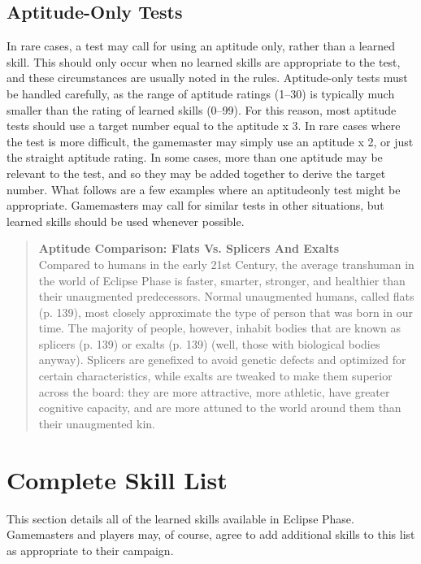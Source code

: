 \subsection{Aptitude-Only Tests}
In rare cases, a test may call for using an aptitude
only, rather than a learned skill. This should only
occur when no learned skills are appropriate to the
test, and these circumstances are usually noted in
the rules.
Aptitude-only tests must be handled carefully, as
the range of aptitude ratings (1–30) is typically much
smaller than the rating of learned skills (0–99). For
this reason, most aptitude tests should use a target
number equal to the aptitude x 3. In rare cases where
the test is more difficult, the gamemaster may simply
use an aptitude x 2, or just the straight aptitude rating.
In some cases, more than one aptitude may be relevant
to the test, and so they may be added together
to derive the target number.
What follows are a few examples where an aptitudeonly
test might be appropriate. Gamemasters may call
for similar tests in other situations, but learned skills
should be used whenever possible.



\begin{quotation}
\textbf{Aptitude Comparison: Flats Vs. Splicers And Exalts}
\\
Compared to humans in the early 21st Century, the average transhuman in the world of Eclipse Phase is faster,
smarter, stronger, and healthier than their unaugmented predecessors. Normal unaugmented humans, called
flats (p. 139), most closely approximate the type of person that was born in our time. The majority of people,
however, inhabit bodies that are known as splicers (p. 139) or exalts (p. 139) (well, those with biological bodies
anyway). Splicers are genefixed to avoid genetic defects and optimized for certain characteristics, while exalts
are tweaked to make them superior across the board: they are more attractive, more athletic, have greater
cognitive capacity, and are more attuned to the world around them than their unaugmented kin.
\end{quotation}


\section{Complete Skill List}



This section details all of the learned skills available
in Eclipse Phase. Gamemasters and players
may, of course, agree to add additional skills to
this list as appropriate to their campaign.

